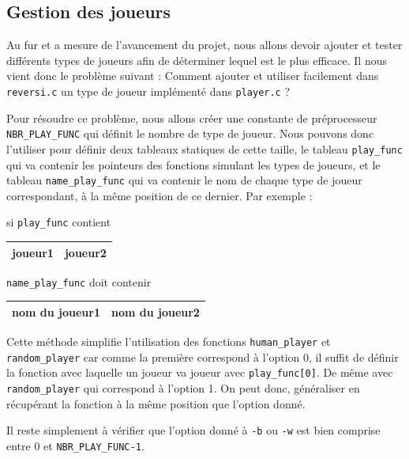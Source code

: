 \documentclass{report}
\begin{document}
\subsection{Gestion des joueurs}

Au fur et a mesure de l'avancement du projet, nous allons devoir ajouter et tester différents types de joueurs afin de déterminer lequel est le plus efficace. Il nous vient donc le problème suivant : Comment ajouter et utiliser facilement dans \texttt{reversi.c} un type de joueur implémenté dans \texttt{player.c} ?

Pour résoudre ce problème, nous allons créer une constante de préprocesseur \texttt{NBR\_PLAY\_FUNC} qui définit le nombre de type de joueur. Nous pouvons donc l'utiliser pour définir deux tableaux statiques de cette taille, le tableau \texttt{play\_func} qui va contenir les pointeurs des fonctions simulant les types de joueurs, et le tableau \texttt{name\_play\_func} qui va contenir le nom de chaque type de joueur correspondant, à la même position de ce dernier.
\newline
Par exemple :

si \texttt{play\_func} contient
\begin{center}
\renewcommand{\arraystretch} {1.5}
       \begin{tabular}{|c|c|}
        \hline
        joueur1 & joueur2 \\
        \hline
    \end{tabular}
\end{center}

\texttt{name\_play\_func} doit contenir
\begin{center}
\renewcommand{\arraystretch} {1.5}
       \begin{tabular}{|c|c|}
        \hline
        nom du joueur1 & nom du joueur2 \\
        \hline
    \end{tabular}
\end{center}


Cette méthode simplifie l'utilisation des fonctions \texttt{human\_player} et \texttt{random\_player} car comme la première correspond à l'option 0, il suffit de définir la fonction avec laquelle un joueur va joueur avec \texttt{play\_func[0]}. De même avec \texttt{random\_player} qui correspond à l'option 1. On peut donc, généraliser en récupérant la fonction à la même position que l'option donné.

Il reste simplement à vérifier que l'option donné à \texttt{-b} ou \texttt{-w} est bien comprise entre 0 et \texttt{NBR\_PLAY\_FUNC-1}.
\end{document}
